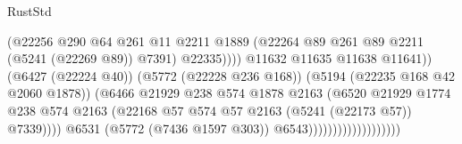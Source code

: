 \begin{lexlean}{RustStd}
\begin{coremodule}
                                                      (@22256
                                                        @290
                                                        @64
                                                        @261
                                                        @11
                                                        @2211
                                                        @1889
                                                        (@22264
                                                          @89
                                                          @261
                                                          @89
                                                          @2211
                                                          (@5241 (@22269 @89))
                                                          @7391)
                                                        @22335))))
                                                @11632
                                                @11635
                                                @11638
                                                @11641))
                                            (@6427 (@22224 @40))
                                            (@5772 (@22228 @236 @168))
                                            (@5194 (@22235 @168 @42 @2060 @1878))
                                            (@6466
                                              @21929
                                              @238
                                              @574
                                              @1878
                                              @2163
                                              (@6520
                                                @21929
                                                @1774
                                                @238
                                                @574
                                                @2163
                                                (@22168
                                                  @57
                                                  @574
                                                  @57
                                                  @2163
                                                  (@5241 (@22173 @57))
                                                  @7339))))
                                          @6531
                                          (@5772 (@7436 @1597 @303))
                                          @6543)))))))))))))))))))

\end{coremodule}
\end{lexlean}
